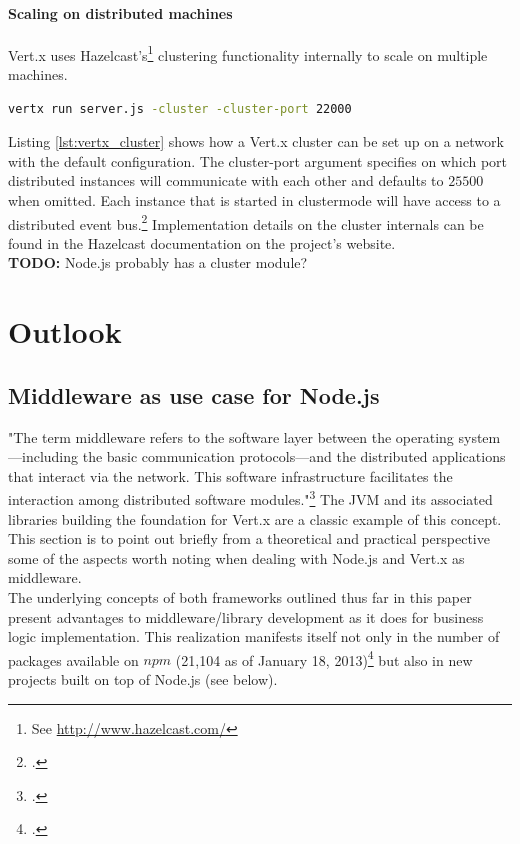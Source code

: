 \paragraph{Scaling on distributed machines}
Vert.x uses Hazelcast's\footnote{See \url{http://www.hazelcast.com/}} clustering
functionality internally to scale on multiple machines.\\

\begin{lstlisting}[language=bash,caption={Starting a vert.x application in cluster mode},label={lst:vertx_cluster}]
vertx run server.js -cluster -cluster-port 22000
\end{lstlisting}

Listing \ref{lst:vertx_cluster} shows how a Vert.x cluster can be set up on a
network with the default configuration. The cluster-port argument specifies on
which port distributed instances will communicate with each other and defaults
to $25500$ when omitted.
Each instance that is started in clustermode will have access to a distributed
event bus.\footcite[Cf.][]{vertx_2012} Implementation details on the cluster
internals can be found in the Hazelcast documentation on the project's
website.\\
\textbf{TODO:} Node.js probably has a cluster module?


\section{Outlook}

\subsection{Middleware as use case for Node.js}
\label{middleware}
"The term middleware refers to the software layer between the operating system—including the basic communication protocols—and the distributed applications that interact via the network. This software infrastructure facilitates the
interaction among distributed software modules."\footcite[]{Geihs_2001} The JVM and its associated libraries building the foundation for Vert.x are a classic example of this concept. This section is to point out briefly from a theoretical and practical perspective some of the aspects worth noting when dealing with Node.js and Vert.x as middleware.\\

The underlying concepts of both frameworks outlined thus far in this paper present advantages to middleware/library development as it does for business logic implementation. This realization manifests itself not only in the number of packages available on $npm$ (21,104 as of January 18, 2013)\footcite[Cf.][]{node_packages} but also in new projects built on top of Node.js (see below).\\

